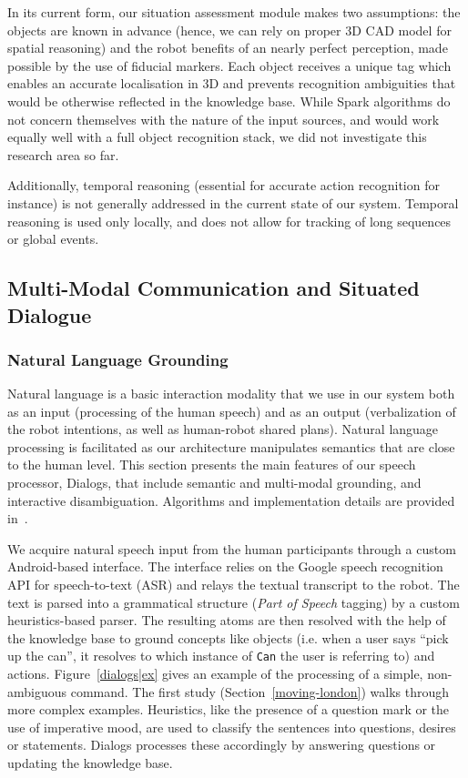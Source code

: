 \documentclass[preprint,3p,times]{elsarticle}
\newcommand{\concept}[1]{{\small \texttt{#1}}}
\newcommand{\ie}{i.e.\xspace}
\begin{document}
In its current form, our situation assessment module makes two 
assumptions: the objects are known in advance (hence, we can rely on proper 3D
CAD model for spatial reasoning) and the robot benefits of an nearly perfect
perception, made possible by the use of fiducial markers.  Each object receives
a unique tag which enables an accurate localisation in 3D and prevents
recognition ambiguities that would be otherwise reflected in the knowledge base.
While {\sc Spark} algorithms do not concern themselves with the nature of the input sources, and
would work equally well with a full object recognition stack, we did not
investigate this research area so far.

Additionally, temporal reasoning (essential for accurate action recognition for
instance) is not generally addressed in the current state of our system. Temporal reasoning is used
only locally, and does not allow for tracking of long sequences or global events.


\subsection{Multi-Modal Communication and Situated Dialogue}
\label{sect|com}

\subsubsection{Natural Language Grounding}
\label{sec:nlp}

Natural language is a basic interaction modality that we use in our system both
as an input (processing of the human speech) and as an output (verbalization of the
robot intentions, as well as human-robot shared plans). Natural language
processing is facilitated as our architecture
manipulates semantics that are close to the
human level. This section presents the main features of our speech processor,
{\sc Dialogs}, that include semantic and multi-modal grounding, and interactive
disambiguation. Algorithms and implementation details are provided
in~\cite{Lemaignan2011a}.

We acquire natural speech input from the human participants through a custom
Android-based interface. The interface relies on the Google speech recognition API for
speech-to-text (ASR) and relays the textual transcript to the robot. The text is parsed into
a grammatical structure (\emph{Part of Speech} tagging) by a custom
heuristics-based parser. The resulting atoms are then resolved with the help of
the knowledge base to ground concepts like
objects (\ie when a user says ``pick up the can'', it resolves to which instance of
\concept{Can} the user is referring to) and actions.  Figure~\ref{dialogs|ex} gives
an example of the processing of a simple, non-ambiguous command. The first
study (Section~\ref{moving-london}) walks through more complex examples.
Heuristics, like the presence of a question mark or the use of imperative mood,
are used to classify the sentences into questions, desires or statements.
{\sc Dialogs} processes these accordingly by answering questions or
updating the knowledge base.
\end{document}
